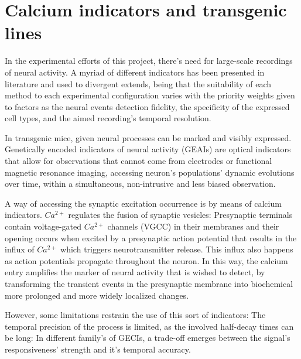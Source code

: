 \section{Calcium indicators and transgenic lines}
\label{sec:sectionb}


In the experimental efforts of this project, there's need for large-scale recordings of neural activity. A myriad of different indicators has been presented in literature and used to divergent extends, being that the suitability of each method to each experimental configuration varies with the priority weights given to factors as the neural events detection fidelity, the specificity of the expressed cell types, and the aimed recording's temporal resolution.

In transgenic mice, given neural processes can be marked and visibly expressed. Genetically encoded indicators of neural activity (GEAIs) are optical indicators that allow for observations that cannot come from electrodes or functional magnetic resonance imaging, accessing neuron's populations' dynamic evolutions over time, within a simultaneous, non-intrusive and less biased observation.


A way of accessing the synaptic excitation occurrence is by means of calcium indicators. $Ca^{2+}$ regulates the fusion of synaptic vesicles: Presynaptic terminals contain voltage-gated $Ca^{2+}$ channels (VGCC) in their membranes and their opening occurs when excited by a presynaptic action potential that results in the influx of $Ca^{2+}$ which triggers neurotransmitter release. This influx also happens as action potentials propagate throughout the neuron. In this way, the calcium entry amplifies the marker of neural activity that is wished to detect, by transforming the transient events in the presynaptic membrane into biochemical more prolonged and more widely localized changes.

However, some limitations restrain the use of this sort of indicators: The temporal precision of the process is limited, as the involved half-decay times can be long: In different family's of GECIs, a trade-off emerges between the signal's responsiveness' strength and it's temporal accuracy.

